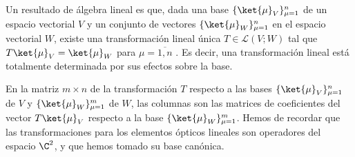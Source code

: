 Un resultado de álgebra lineal es que, dada una base $\{\ket{\mu}_V\}_{\mu=1}^n$ de un espacio vectorial $V$ y un conjunto de vectores $\{\ket{\mu}_W\}_{\mu=1}^n$ en el espacio vectorial $W$, existe una transformación lineal única $T\in \mathcal L(V; W)$ tal que $T\ket{\mu}_V = \ket{\mu}_W$ para $\mu = \overline{1, n}$ \parencite{axler-2023}. Es decir, una transformación lineal está totalmente determinada por sus efectos sobre la base.

En la matriz $m\times n$ de la transformación $T$ respecto a las bases $\{\ket{\mu}_V\}_{\mu=1}^n$ de $V$ y $\{\ket{\mu}_W\}_{\mu=1}^m$ de $W$, las columnas son las matrices de coeficientes del vector $T \ket{\mu}_V$ respecto a la base $\{\ket{\mu}_W\}_{\mu=1}^m$. Hemos de recordar que las transformaciones para los elementos ópticos lineales son operadores del espacio $\C^2$, y que hemos tomado su base canónica.

